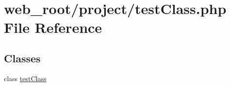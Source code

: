 \hypertarget{testClass_8php}{}\section{web\+\_\+root/project/test\+Class.php File Reference}
\label{testClass_8php}
\subsection*{Classes}
\begin{DoxyCompactItemize}
\item 
class \hyperlink{classtestClass}{test\+Class}
\end{DoxyCompactItemize}
